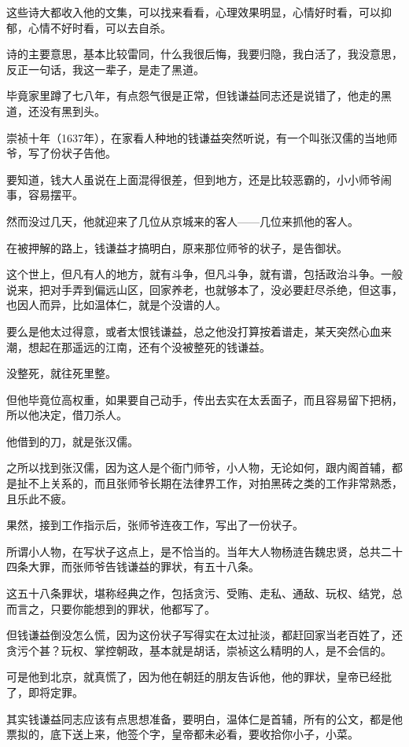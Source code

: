 \begin{multicols}{\theparacolNo}
		这些诗大都收入他的文集，可以找来看看，心理效果明显，心情好时看，可以抑郁，心情不好时看，可以去自杀。

		诗的主要意思，基本比较雷同，什么我很后悔，我要归隐，我白活了，我没意思，反正一句话，我这一辈子，是走了黑道。

		毕竟家里蹲了七八年，有点怨气很是正常，但钱谦益同志还是说错了，他走的黑道，还没有黑到头。

		崇祯十年（1637年），在家看人种地的钱谦益突然听说，有一个叫张汉儒的当地师爷，写了份状子告他。

		要知道，钱大人虽说在上面混得很差，但到地方，还是比较恶霸的，小小师爷闹事，容易摆平。

		然而没过几天，他就迎来了几位从京城来的客人——几位来抓他的客人。

		在被押解的路上，钱谦益才搞明白，原来那位师爷的状子，是告御状。

		这个世上，但凡有人的地方，就有斗争，但凡斗争，就有谱，包括政治斗争。一般说来，把对手弄到偏远山区，回家养老，也就够本了，没必要赶尽杀绝，但这事，也因人而异，比如温体仁，就是个没谱的人。

		要么是他太过得意，或者太恨钱谦益，总之他没打算按着谱走，某天突然心血来潮，想起在那遥远的江南，还有个没被整死的钱谦益。

		没整死，就往死里整。

		但他毕竟位高权重，如果要自己动手，传出去实在太丢面子，而且容易留下把柄，所以他决定，借刀杀人。

		他借到的刀，就是张汉儒。

		之所以找到张汉儒，因为这人是个衙门师爷，小人物，无论如何，跟内阁首辅，都是扯不上关系的，而且张师爷长期在法律界工作，对拍黑砖之类的工作非常熟悉，且乐此不疲。

		果然，接到工作指示后，张师爷连夜工作，写出了一份状子。

		所谓小人物，在写状子这点上，是不恰当的。当年大人物杨涟告魏忠贤，总共二十四条大罪，而张师爷告钱谦益的罪状，有五十八条。

		这五十八条罪状，堪称经典之作，包括贪污、受贿、走私、通敌、玩权、结党，总而言之，只要你能想到的罪状，他都写了。

		但钱谦益倒没怎么慌，因为这份状子写得实在太过扯淡，都赶回家当老百姓了，还贪污个甚？玩权、掌控朝政，基本就是胡话，崇祯这么精明的人，是不会信的。

		可是他到北京，就真慌了，因为他在朝廷的朋友告诉他，他的罪状，皇帝已经批了，即将定罪。

		其实钱谦益同志应该有点思想准备，要明白，温体仁是首辅，所有的公文，都是他票拟的，底下送上来，他签个字，皇帝都未必看，要收拾你小子，小菜。


\end{multicols}
